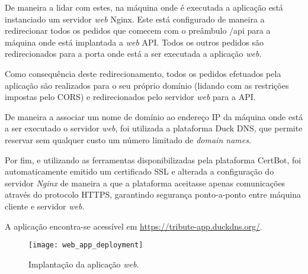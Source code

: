 De maneira a lidar com estes, na máquina onde é executada a aplicação está instanciado um servidor \textit{web} Nginx. Este está configurado de maneira a redirecionar todos os pedidos que comecem com o preâmbulo /api para a máquina onde está implantada a \textit{web} API. Todos os outros pedidos são redirecionados para a porta onde está a ser executada a aplicação \textit{web}. 

\par \medskip

Como consequência deste redirecionamento, todos os pedidos efetuados pela aplicação são realizados para o seu próprio domínio (lidando com as restrições impostas pelo CORS) e redirecionados pelo servidor \textit{web} para a API.

\par \medskip

De maneira a associar um nome de domínio ao endereço IP da máquina onde está a ser executado o servidor \textit{web}, foi utilizada a plataforma Duck DNS, que permite reservar sem qualquer custo um número limitado de \textit{domain names}.

\par \medskip

Por fim, e utilizando as ferramentas disponibilizadas pela plataforma CertBot, foi automaticamente emitido um certificado SSL e alterada a configuração do servidor \textit{Nginx} de maneira a que a plataforma aceitasse apenas comunicações através do protocolo HTTPS, garantindo segurança ponto-a-ponto entre máquina cliente e servidor \textit{web}.

\par \medskip

A aplicação encontra-se acessível em \url{https://tribute-app.duckdns.org/}.

\begin{figure}[h]
	\centering
	\texttt{[image: web\_app\_deployment]}
	\caption{Implantação da aplicação \textit{web}.}
\end{figure}
